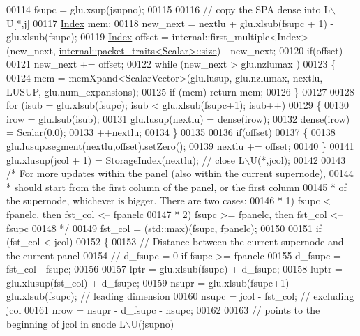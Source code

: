 \begin{DoxyCode}
00114   fsupc = glu.xsup(jsupno);
00115   
00116   \textcolor{comment}{// copy the SPA dense into L\(\backslash\)U[*,j]}
00117   \hyperlink{namespace_eigen_a62e77e0933482dafde8fe197d9a2cfde}{Index} mem; 
00118   new\_next = nextlu + glu.xlsub(fsupc + 1) - glu.xlsub(fsupc); 
00119   \hyperlink{namespace_eigen_a62e77e0933482dafde8fe197d9a2cfde}{Index} offset = internal::first\_multiple<Index>(new\_next, 
      \hyperlink{struct_eigen_1_1internal_1_1packet__traits}{internal::packet\_traits<Scalar>::size}) - new\_next;
00120   \textcolor{keywordflow}{if}(offset)
00121     new\_next += offset;
00122   \textcolor{keywordflow}{while} (new\_next > glu.nzlumax )
00123   \{
00124     mem = memXpand<ScalarVector>(glu.lusup, glu.nzlumax, nextlu, LUSUP, glu.num\_expansions);  
00125     \textcolor{keywordflow}{if} (mem) \textcolor{keywordflow}{return} mem; 
00126   \}
00127   
00128   \textcolor{keywordflow}{for} (isub = glu.xlsub(fsupc); isub < glu.xlsub(fsupc+1); isub++)
00129   \{
00130     irow = glu.lsub(isub);
00131     glu.lusup(nextlu) = dense(irow);
00132     dense(irow) = Scalar(0.0); 
00133     ++nextlu; 
00134   \}
00135   
00136   \textcolor{keywordflow}{if}(offset)
00137   \{
00138     glu.lusup.segment(nextlu,offset).setZero();
00139     nextlu += offset;
00140   \}
00141   glu.xlusup(jcol + 1) = StorageIndex(nextlu);  \textcolor{comment}{// close L\(\backslash\)U(*,jcol); }
00142   
00143   \textcolor{comment}{/* For more updates within the panel (also within the current supernode),}
00144 \textcolor{comment}{   * should start from the first column of the panel, or the first column}
00145 \textcolor{comment}{   * of the supernode, whichever is bigger. There are two cases:}
00146 \textcolor{comment}{   *  1) fsupc < fpanelc, then fst\_col <-- fpanelc}
00147 \textcolor{comment}{   *  2) fsupc >= fpanelc, then fst\_col <-- fsupc}
00148 \textcolor{comment}{   */}
00149   fst\_col = (std::max)(fsupc, fpanelc); 
00150   
00151   \textcolor{keywordflow}{if} (fst\_col  < jcol)
00152   \{
00153     \textcolor{comment}{// Distance between the current supernode and the current panel}
00154     \textcolor{comment}{// d\_fsupc = 0 if fsupc >= fpanelc}
00155     d\_fsupc = fst\_col - fsupc; 
00156     
00157     lptr = glu.xlsub(fsupc) + d\_fsupc; 
00158     luptr = glu.xlusup(fst\_col) + d\_fsupc; 
00159     nsupr = glu.xlsub(fsupc+1) - glu.xlsub(fsupc); \textcolor{comment}{// leading dimension}
00160     nsupc = jcol - fst\_col; \textcolor{comment}{// excluding jcol }
00161     nrow = nsupr - d\_fsupc - nsupc; 
00162     
00163     \textcolor{comment}{// points to the beginning of jcol in snode L\(\backslash\)U(jsupno) }

\end{DoxyCode}
